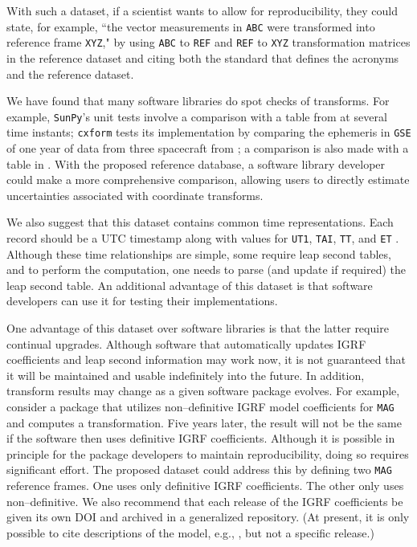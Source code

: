\documentclass[draft]{agujournal2019}
\begin{document}
With such a dataset, if a scientist wants to allow for reproducibility, they could state, for example, ``the vector measurements in \texttt{ABC} were transformed into reference frame \texttt{XYZ}," by using \texttt{ABC} to \texttt{REF} and \texttt{REF} to \texttt{XYZ} transformation matrices in the reference dataset and citing both the standard that defines the acronyms and the reference dataset.

We have found that many software libraries do spot checks of transforms. For example, \texttt{SunPy}'s unit tests \cite{SunPy} involve a comparison with a table from  at several time instants; \texttt{cxform} \cite{cxform} tests its implementation by comparing the ephemeris in \texttt{GSE} of one year of data from three spacecraft from ; a comparison is also made with a table in . With the proposed reference database, a software library developer could make a more comprehensive comparison, allowing users to directly estimate uncertainties associated with coordinate transforms.

We also suggest that this dataset contains common time representations. Each record should be a UTC timestamp along with values for \texttt{UT1}, \texttt{TAI}, \texttt{TT}, and \texttt{ET} \cite{McCarthy2011}. Although these time relationships are simple, some require leap second tables, and to perform the computation, one needs to parse (and update if required) the leap second table. An additional advantage of this dataset is that software developers can use it for testing their implementations.



One advantage of this dataset over software libraries is that the latter require continual upgrades. Although software that automatically updates IGRF coefficients and leap second information may work now, it is not guaranteed that it will be maintained and usable indefinitely into the future. In addition, transform results may change as a given software package evolves. For example, consider a package that utilizes non--definitive IGRF model coefficients for \texttt{MAG} and computes a transformation. Five years later, the result will not be the same if the software then uses definitive IGRF coefficients. Although it is possible in principle for the package developers to maintain reproducibility, doing so requires significant effort. The proposed dataset could address this by defining two \texttt{MAG} reference frames. One uses only definitive IGRF coefficients. The other only uses non--definitive. We also recommend that each release of the IGRF coefficients be given its own DOI and archived in a generalized repository. (At present, it is only possible to cite descriptions of the model, e.g., , but not a specific release.)
\end{document}
